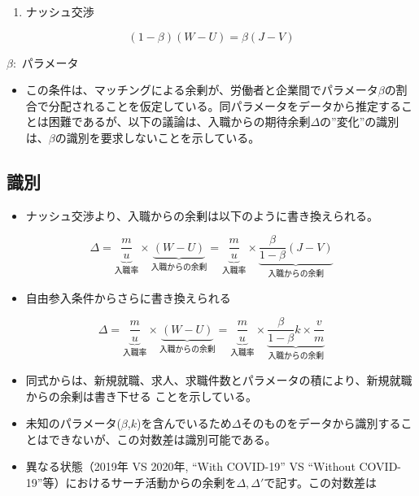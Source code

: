 \documentclass[
]{book}
\providecommand{\tightlist}{%
  \setlength{\itemsep}{0pt}\setlength{\parskip}{0pt}}
\begin{document}
\begin{enumerate}
\def\labelenumi{\arabic{enumi}.}
\setcounter{enumi}{3}
\tightlist
\item
  ナッシュ交渉
\end{enumerate}

\[(1-\beta)(W-U)=\beta(J-V)\]

\(\beta:\) パラメータ

\begin{itemize}
\tightlist
\item
  この条件は、マッチングによる余剰が、労働者と企業間でパラメータ\(\beta\)の割合で分配されることを仮定している。同パラメータをデータから推定することは困難であるが、以下の議論は、入職からの期待余剰\(\Delta\)の''変化''の識別は、\(\beta\)の識別を要求しないことを示している。
\end{itemize}

\hypertarget{ux8b58ux5225}{%
\subsection{識別}\label{ux8b58ux5225}}

\begin{itemize}
\tightlist
\item
  ナッシュ交渉より、入職からの余剰は以下のように書き換えられる。
\end{itemize}

\[\Delta = \underbrace{\frac{m}{u}}_{入職率}\times \underbrace{(W-U)}_{入職からの余剰}=\underbrace{\frac{m}{u}}_{入職率}\times \underbrace{\frac{\beta}{1-\beta}(J-V)}_{入職からの余剰}\]

\begin{itemize}
\tightlist
\item
  自由参入条件からさらに書き換えられる
\end{itemize}

\[\Delta = \underbrace{\frac{m}{u}}_{入職率}\times \underbrace{(W-U)}_{入職からの余剰}=\underbrace{\frac{m}{u}}_{入職率}\times \underbrace{\frac{\beta}{1-\beta}k\times\frac{v}{m}}_{入職からの余剰}\]

\begin{itemize}
\item
  同式からは、新規就職、求人、求職件数とパラメータの積により、新規就職からの余剰は書き下せる
  ことを示している。
\item
  未知のパラメータ(\(\beta\),\(k\))を含んでいるため\(\Delta\)そのものをデータから識別することはできないが、この対数差は識別可能である。
\item
  異なる状態（2019年 VS 2020年, ``With COVID-19'' VS ``Without COVID-19''等）におけるサーチ活動からの余剰を\(\Delta,\Delta'\)で記す。この対数差は
\end{itemize}
\end{document}
